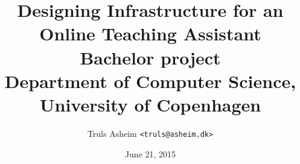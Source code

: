 \documentclass[a4paper,11pt,oneside]{memoir}
\title{Designing Infrastructure for an Online Teaching Assistant\\ \hfill \break Bachelor project\\\large Department of Computer Science, University of Copenhagen}
\author{Truls Asheim \texttt{<truls@asheim.dk>}}
\date{June 21, 2015}
\theoremstyle{definition}
\begin{document}
\ClearWallPaper


\begin{titlingpage}
\maketitle
\end{titlingpage}



\tableofcontents

\clearpage








\printbibliography

\appendix
\end{document}
